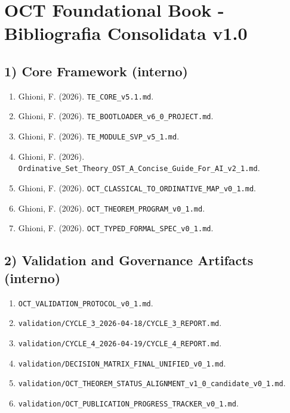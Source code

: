 \chapter{OCT Foundational Book - Bibliografia Consolidata v1.0}

\section{1) Core Framework (interno)}

\begin{enumerate}
\def\labelenumi{\arabic{enumi}.}
\tightlist
\item
  Ghioni, F. (2026). \texttt{TE\_CORE\_v5.1.md}.
\item
  Ghioni, F. (2026). \texttt{TE\_BOOTLOADER\_v6\_0\_PROJECT.md}.
\item
  Ghioni, F. (2026). \texttt{TE\_MODULE\_SVP\_v5\_1.md}.
\item
  Ghioni, F. (2026). \texttt{Ordinative\_Set\_Theory\_OST\_A\_Concise\_Guide\_For\_AI\_v2\_1.md}.
\item
  Ghioni, F. (2026). \texttt{OCT\_CLASSICAL\_TO\_ORDINATIVE\_MAP\_v0\_1.md}.
\item
  Ghioni, F. (2026). \texttt{OCT\_THEOREM\_PROGRAM\_v0\_1.md}.
\item
  Ghioni, F. (2026). \texttt{OCT\_TYPED\_FORMAL\_SPEC\_v0\_1.md}.
\end{enumerate}

\section{2) Validation and Governance Artifacts (interno)}

\begin{enumerate}
\def\labelenumi{\arabic{enumi}.}
\tightlist
\item
  \texttt{OCT\_VALIDATION\_PROTOCOL\_v0\_1.md}.
\item
  \texttt{validation/CYCLE\_3\_2026-04-18/CYCLE\_3\_REPORT.md}.
\item
  \texttt{validation/CYCLE\_4\_2026-04-19/CYCLE\_4\_REPORT.md}.
\item
  \texttt{validation/DECISION\_MATRIX\_FINAL\_UNIFIED\_v0\_1.md}.
\item
  \texttt{validation/OCT\_THEOREM\_STATUS\_ALIGNMENT\_v1\_0\_candidate\_v0\_1.md}.
\item
  \texttt{validation/OCT\_PUBLICATION\_PROGRESS\_TRACKER\_v0\_1.md}.
\end{enumerate}

